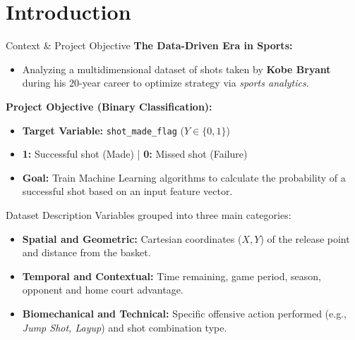 \section{Introduction}

\begin{frame}{Context \& Project Objective}
    \textbf{The Data-Driven Era in Sports:}
    \begin{itemize}
        \item Analyzing a multidimensional dataset of shots taken by \textbf{Kobe Bryant} during his 20-year career to optimize strategy via \textit{sports analytics}.
    \end{itemize}
    \vspace{0.3cm}
    \textbf{Project Objective (Binary Classification):}
    \begin{itemize}
        \item \textbf{Target Variable:} \texttt{shot\_made\_flag} ($Y \in \{0, 1\}$)
        \item \textbf{1:} Successful shot (Made) | \textbf{0:} Missed shot (Failure)
        \item \textbf{Goal:} Train Machine Learning algorithms to calculate the probability of a successful shot based on an input feature vector.
    \end{itemize}
\end{frame}

\begin{frame}{Dataset Description}
    Variables grouped into three main categories:
    \begin{itemize}
        \item \textbf{Spatial and Geometric:} Cartesian coordinates ($X, Y$) of the release point and distance from the basket.
        \item \textbf{Temporal and Contextual:} Time remaining, game period, season, opponent and home court advantage.
        \item \textbf{Biomechanical and Technical:} Specific offensive action performed (e.g., \textit{Jump Shot, Layup}) and shot combination type.
    \end{itemize}
\end{frame}
